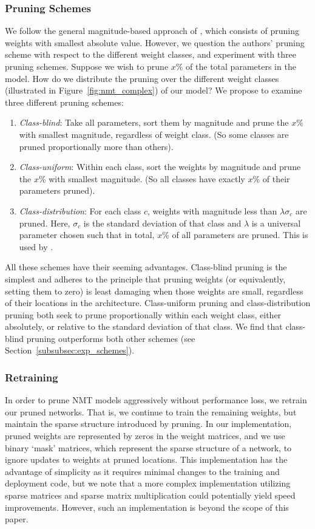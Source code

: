 \subsubsection{Pruning Schemes}
\label{subsubsec:approach_schemes}
We follow the general magnitude-based approach of \cite{han2015learning}, which consists of pruning weights with smallest absolute value. However, we question the authors' pruning scheme with respect to the different weight classes, and experiment with three pruning schemes.
Suppose we wish to prune $x$\% of the total parameters in the model. 
How do we distribute the pruning over the different weight classes (illustrated in Figure~\ref{fig:nmt_complex}) of our model? 
We propose to examine three different pruning schemes:
\begin{enumerate}
\item \textit{Class-blind}: 
Take all parameters, sort them by magnitude and prune the $x$\% with smallest magnitude, regardless of weight class.
(So some classes are pruned proportionally more than others).
\item \textit{Class-uniform}: 
Within each class, sort the weights by magnitude and prune the $x$\% with smallest magnitude.
(So all classes have exactly $x$\% of their parameters pruned).
\item \textit{Class-distribution}: 
 For each class $c$, weights with magnitude less than $\lambda \sigma_c$ are
 pruned. Here, $\sigma_c$ is the standard deviation of that class and $\lambda$ is a universal parameter chosen such that in total, $x\%$ of all parameters are pruned.
This is used by \cite{han2015learning}.
\end{enumerate}
All these schemes have their seeming advantages.
Class-blind pruning is the simplest and adheres to the principle that pruning
weights (or equivalently, setting them to zero) is least damaging when
those weights are small, regardless of their locations in the architecture.
Class-uniform pruning and class-distribution pruning both seek to prune
proportionally within each weight class, either absolutely, or relative to the
standard deviation of that class.
We find that class-blind pruning outperforms both other schemes (see
Section~\ref{subsubsec:exp_schemes}).

\subsubsection{Retraining}
\label{subsubsec:approach_retraining}
In order to prune NMT models aggressively without performance loss, we retrain our pruned networks. 
That is, we continue to train the remaining weights, but maintain the sparse structure introduced by pruning.
In our implementation, pruned weights are represented by zeros in the weight matrices, 
and we use binary `mask' matrices, which represent the sparse structure of a network, 
to ignore updates to weights at pruned locations.
This implementation has the advantage of simplicity as it requires minimal changes to the training and deployment code, 
but we note that a more complex implementation utilizing sparse matrices and sparse matrix multiplication could potentially yield speed improvements.
However, such an implementation is beyond the scope of this paper.

